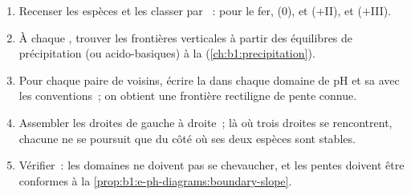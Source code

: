 \begin{method}\label{met:b1:e-ph-diagrams:build}
\begin{enumerate}
  \item Recenser les espèces et les classer par ~:
        pour le fer,  (0),  et  ($+$II),
         et  ($+$III).
  \item À chaque , trouver les frontières verticales à
        partir des équilibres de précipitation (ou acido-basiques) à la
         (\cref{ch:b1:precipitation}).
  \item Pour chaque paire de  voisins, écrire la
         dans chaque domaine de pH et sa 
        avec les conventions~; on obtient une frontière rectiligne de
        pente connue.
  \item Assembler les droites de gauche à droite~; là où trois droites
        se rencontrent, chacune ne se poursuit que du côté où ses deux
        espèces sont stables.
  \item Vérifier~: les domaines ne doivent pas se chevaucher, et les
        pentes doivent être conformes à la
        \cref{prop:b1:e-ph-diagrams:boundary-slope}.
\end{enumerate}
\end{method}

